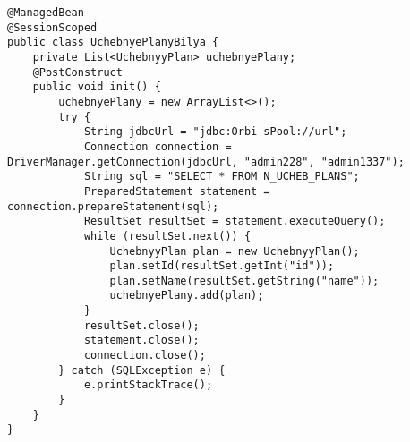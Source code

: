 \documentclass{article}
\begin{document}
\begin{lstlisting}[frame=single, basicstyle=\ttfamily, breaklines=true, breakatwhitespace=true, postbreak=\mbox{\textcolor{red}{$\hookrightarrow$}\space}]
@ManagedBean
@SessionScoped
public class UchebnyePlanyBilya {
    private List<UchebnyyPlan> uchebnyePlany;
    @PostConstruct
    public void init() {
        uchebnyePlany = new ArrayList<>();
        try {
            String jdbcUrl = "jdbc:Orbi sPool://url";
            Connection connection = DriverManager.getConnection(jdbcUrl, "admin228", "admin1337");
            String sql = "SELECT * FROM N_UCHEB_PLANS";
            PreparedStatement statement = connection.prepareStatement(sql);
            ResultSet resultSet = statement.executeQuery();
            while (resultSet.next()) {
                UchebnyyPlan plan = new UchebnyyPlan();
                plan.setId(resultSet.getInt("id"));
                plan.setName(resultSet.getString("name"));
                uchebnyePlany.add(plan);
            }
            resultSet.close();
            statement.close();
            connection.close();
        } catch (SQLException e) {
            e.printStackTrace();
        }
    }
}    
\end{lstlisting}
\end{document}
